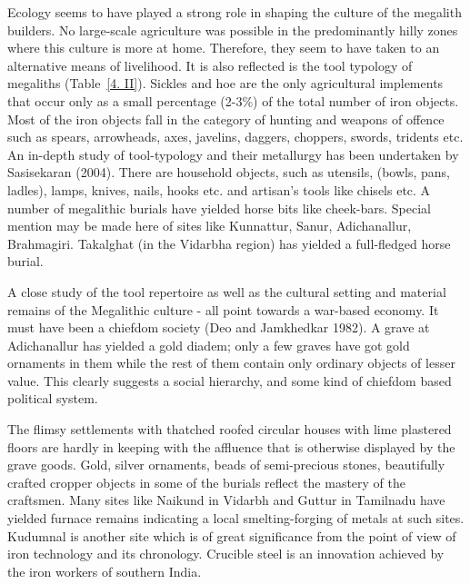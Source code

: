 Ecology seems to have played a strong role in shaping the culture of the megalith builders. No large-scale agriculture was possible in the predominantly hilly zones where this culture is more at home. Therefore, they seem to have taken to an alternative means of livelihood. It is also reflected is the tool typology of megaliths (Table~\ref{4. II}). Sickles and hoe are the only agricultural implements that occur only as a small percentage (2-3\%) of the total number of iron objects. Most of the iron objects fall in the category of hunting and weapons of offence such as spears, arrowheads, axes, javelins, daggers, choppers, swords, tridents etc. An in-depth study of tool-typology and their metallurgy has been undertaken by Sasisekaran (2004).  There are household objects, such as utensils, (bowls, pans, ladles), lamps, knives, nails, hooks etc. and artisan's tools like chisels etc. A number of megalithic burials have yielded horse bits like cheek-bars. Special mention may be made here of sites like Kunnattur, Sanur, Adichanallur, Brahmagiri. Takalghat (in the Vidarbha region) has yielded a full-fledged horse burial.

A close study of the tool repertoire as well as the cultural setting and material remains of the Megalithic culture - all point towards a war-based economy. It must have been a chiefdom society (Deo and Jamkhedkar 1982). A grave at Adichanallur has yielded a gold diadem; only a few graves have got gold ornaments in them while the rest of them contain only ordinary objects of lesser value. This clearly suggests a social hierarchy, and some kind of chiefdom based political system.

The flimsy settlements with thatched roofed circular houses with lime plastered floors are hardly in keeping with the affluence that is otherwise displayed by the grave goods. Gold, silver ornaments, beads of semi-precious stones, beautifully crafted cropper objects in some of the burials reflect the mastery of the craftsmen. Many sites like Naikund in Vidarbh and Guttur in Tamilnadu have yielded furnace remains indicating a local smelting-forging of metals at such sites. Kudumnal is another site which is of great significance from the point of view of iron technology and its chronology. Crucible steel is an innovation achieved by the iron workers of southern India. 

